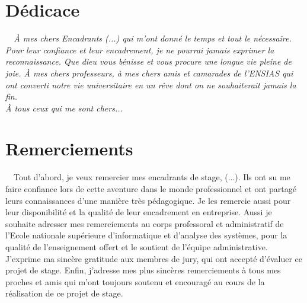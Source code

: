 \documentclass[a4paper, oneside, french, 12pt, final]{extreport}
\newcommand{\reportAuthor} {%
  FirstName \textsc{LastName}%
}
\begin{document}





\chapter*{Dédicace}
\thispagestyle{empty}
%

\begin{center}
  {\it ~~À mes chers Encadrants (...) qui m'ont donné le temps et tout le nécessaire. Pour leur confiance et leur encadrement, je ne pourrai jamais exprimer la reconnaissance. Que dieu vous bénisse et vous procure une longue vie pleine de joie. À mes chers professeurs, à mes chers amis et camarades de l’ENSIAS qui ont converti notre vie universitaire en un rêve dont on ne souhaiterait jamais la fin.\\
    \vspace{1cm}
    À tous ceux qui me sont chers...
  }
\end{center}
%
%

\chapter*{Remerciements}
\thispagestyle{empty}
~~Tout d’abord, je veux remercier mes encadrants de stage, (...). Ils ont su me faire confiance lors 
de cette aventure dans le monde professionnel et ont partagé leurs connaissances d’une manière très 
pédagogique. Je les remercie aussi pour leur disponibilité et la qualité de leur encadrement en 
entreprise. Aussi je souhaite adresser mes remerciements au corps professoral et administratif de 
l’Ecole nationale supérieure d’informatique et d’analyse des systèmes, pour la qualité de l’enseignement 
offert et le soutient de l’équipe administrative. J'exprime ma sincère gratitude aux membres de jury, 
qui ont accepté d’évaluer ce projet de stage. Enfin, j'adresse mes plus sincères remerciements à tous 
mes proches et amis qui m'ont toujours soutenu et encouragé au cours de la réalisation de ce projet de stage.

\end{document}
